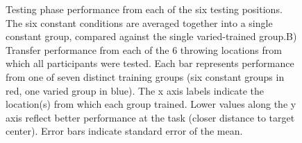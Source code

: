 \documentclass[
  12pt,
  letterpaper,
]{article}
\begin{document}
\begin{figure}


\caption{\label{fig-e2testa}Testing phase performance from each of the
six testing positions. The six constant conditions are averaged together
into a single constant group, compared against the single varied-trained
group.B) Transfer performance from each of the 6 throwing locations from
which all participants were tested. Each bar represents performance from
one of seven distinct training groups (six constant groups in red, one
varied group in blue). The x axis labels indicate the location(s) from
which each group trained. Lower values along the y axis reflect better
performance at the task (closer distance to target center). Error bars
indicate standard error of the mean.}

\end{figure}%

\hfill\break
\hfill\break
\hfill\break
\end{document}
